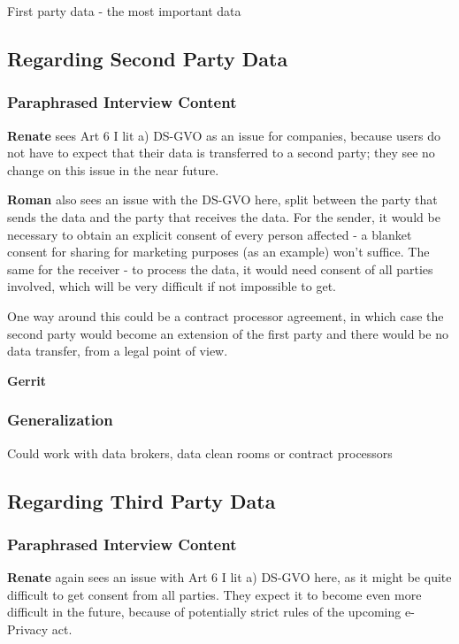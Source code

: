 First party data - the most important data

\subsection{Regarding Second Party Data}

\subsubsection{Paraphrased Interview Content}

\textbf{Renate} sees Art 6 I lit a) DS-GVO as an issue for companies, because users do not have to expect that their data is transferred to a second party; they see no change on this issue in the near future.

\textbf{Roman} also sees an issue with the DS-GVO here, split between the party that sends the data and the party that receives the data. For the sender, it would be necessary to obtain an explicit consent of every person affected - a blanket consent for sharing for marketing purposes (as an example) won't suffice. The same for the receiver - to process the data, it would need consent of all parties involved, which will be very difficult if not impossible to get.

One way around this could be a contract processor agreement, in which case the second party would become an extension of the first party and there would be no data transfer, from a legal point of view.

\textbf{Gerrit} 

\subsubsection{Generalization}

Could work with data brokers, data clean rooms or contract processors

\subsection{Regarding Third Party Data}

\subsubsection{Paraphrased Interview Content}

\textbf{Renate} again sees an issue with Art 6 I lit a) DS-GVO here, as it might be quite difficult to get consent from all parties. They expect it to become even more difficult in the future, because of potentially strict rules of the upcoming e-Privacy act.

